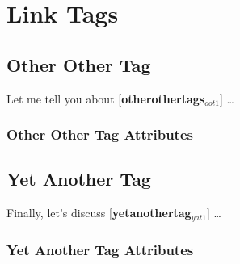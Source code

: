 \documentclass[11pt]{article}
\newcommand{\otherothertag}[2]{[\textbf{\color{darkred}#1}$_{oot#2}$]}
\newcommand{\yetanothertag}[2]{[\textbf{\color{brown}#1}$_{yat#2}$]}
\begin{document}

\section{Link Tags} %
\label{sec:link_tags}

\subsection{Other Other Tag} %
\label{sub:other_other_tag}
Let me tell you about \otherothertag{otherothertags}{1} \ldots

\subsubsection{Other Other Tag Attributes} %
\label{ssub:other_other_tag_attributes}



\subsection{Yet Another Tag} %
\label{sub:yet_another_tag}
Finally, let's discuss \yetanothertag{yetanothertag}{1} \ldots

\subsubsection{Yet Another Tag Attributes} %
\label{ssub:yet_another_tag_attributes}


\end{document}
